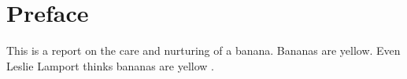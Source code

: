\chapter{Preface}

This is a report on the care and nurturing of a \gls{banana}.
Bananas are yellow. 
Even Leslie Lamport thinks bananas are yellow \cite{lamport94}.
